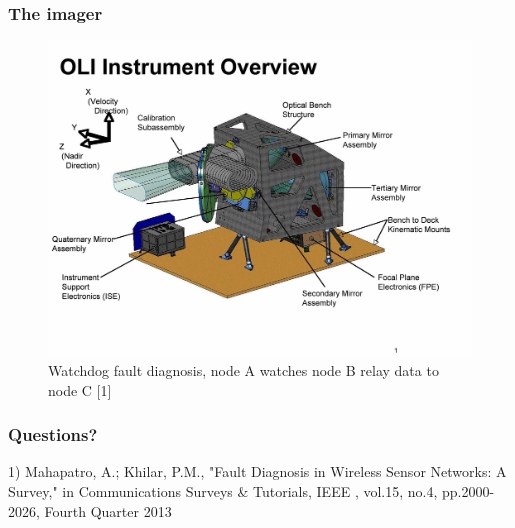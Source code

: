 \documentclass{beamer}
\begin{document}
    \begin{frame}
        \frametitle{The imager }
            \begin{figure}
            \includegraphics[width=.6\paperheight]{figures/landsatimager.jpg}
            \caption{Watchdog fault diagnosis, node A watches node B relay data to node C [1]}
         \end{figure}


    \end{frame}


    
    \begin{frame}
        \frametitle{Questions?}
        1) Mahapatro, A.; Khilar, P.M., "Fault Diagnosis in Wireless Sensor Networks: A Survey," in Communications Surveys & Tutorials, IEEE , vol.15, no.4, pp.2000-2026, Fourth Quarter 2013
    \end{frame}
\end{document}
